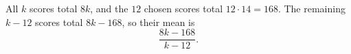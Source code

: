 All $k$ scores total $8k$, and the $12$ chosen scores total $12\cdot14=168$. The remaining $k-12$ scores total $8k-168$, so their mean is
\[\boxed{\dfrac{8k-168}{k-12}}.\]
